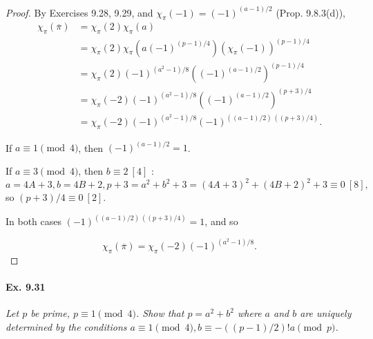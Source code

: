 \documentclass[11pt,a4paper]{article}
\begin{document}
\begin{proof}
By Exercises 9.28, 9.29, and $\chi_\pi(-1) =(-1)^{(a-1)/2}$ (Prop. 9.8.3(d)),
\begin{align*}
\chi_{\pi}(\overline{\pi})&=  \chi_\pi(2) \chi_\pi(a)\\
&=\chi_\pi(2) \chi_\pi(a(-1)^{(p-1)/4})(\chi_\pi(-1))^{(p-1)/4}\\
&=\chi_\pi(2) (-1)^{(a^2-1)/8} ((-1)^{(a-1)/2})^{(p-1)/4}\\
&=\chi_\pi (-2)(-1)^{(a^2-1)/8} ((-1)^{(a-1)/2})^{(p+3)/4}\\
&=\chi_\pi(-2) (-1)^{(a^2-1)/8}  (-1)^{((a-1)/2)\,((p+3)/4)}.
\end{align*}

If $a \equiv 1 \pmod 4$, then $(-1)^{(a-1)/2}=1$.

If $a \equiv 3 \pmod 4$, then $b \equiv 2 \ [4]$ : $$a=4A+3,b=4B+2,p+3 = a^2+b^2+3 = (4A+3)^2+(4B+2)^2+3 \equiv 0 \ [8],$$ so $(p+3)/4 \equiv 0 \ [2].$

In both cases  $  (-1)^{((a-1)/2)\,((p+3)/4)}=1$, and so

$$\chi_{\pi}(\overline{\pi})=\chi_\pi(-2) (-1)^{(a^2-1)/8}.  $$
\end{proof}

\paragraph{Ex. 9.31}

{\it Let $p$ be prime, $p\equiv 1 \pmod 4$. Show that $p = a^2+b^2$ where $a$ and $b$ are uniquely determined by the conditions $a \equiv 1 \pmod 4, b \equiv -((p-1)/2)! a \pmod p$.
}
\end{document}
